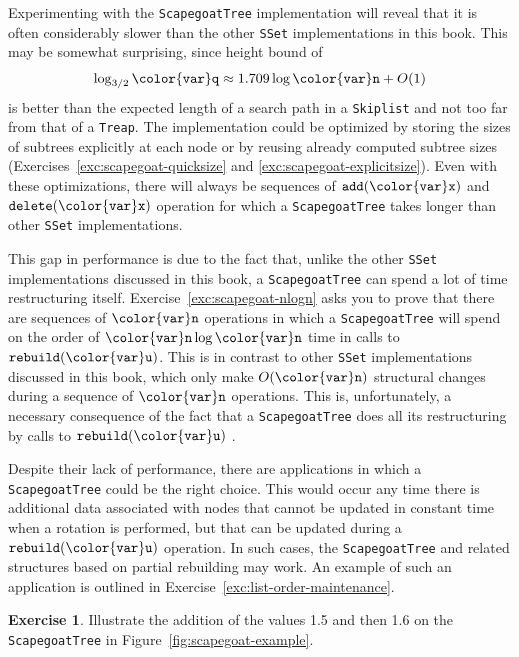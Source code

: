 \documentclass[10pt]{book}
\newcommand{\figref}[1]{Figure~\ref{fig:#1}}
\theoremstyle{plain}
\theoremstyle{definition}
\newtheorem{exc}{Exercise}[chapter]
\newcommand{\excref}[1]{Exercise~\ref{exc:#1}}
\begin{document}
Experimenting with the \texttt{ScapegoatTree} implementation will reveal that
it is often considerably slower than the other \texttt{SSet} implementations
in this book. This may be somewhat surprising, since height bound of
\[
   \log_{3/2}\ensuremath{\mathtt{{\color{var}q}}} \approx 1.709\log \ensuremath{\mathtt{{\color{var}n}}} + O(1)
\] 
is better than the expected length of a search path in a \texttt{Skiplist} and
not too far from that of a \texttt{Treap}.  The implementation could be optimized
by storing the sizes of subtrees explicitly at each node or by reusing
already computed subtree sizes (Exercises~\ref{exc:scapegoat-quicksize}
and \ref{exc:scapegoat-explicitsize}).  Even with these optimizations,
there will always be sequences of \ensuremath{\mathtt{add({\color{var}x})}} and \ensuremath{\mathtt{delete({\color{var}x})}} operation for
which a \texttt{ScapegoatTree} takes longer than other \texttt{SSet} implementations.

This gap in performance is due to the fact that, unlike the other \texttt{SSet}
implementations discussed in this book, a \texttt{ScapegoatTree} can spend a lot
of time restructuring itself.  \excref{scapegoat-nlogn} asks you to prove
that there are sequences of \ensuremath{\mathtt{{\color{var}n}}} operations in which a \texttt{ScapegoatTree}
will spend on the order of $\ensuremath{\mathtt{{\color{var}n}}}\log \ensuremath{\mathtt{{\color{var}n}}}$ time in calls to \ensuremath{\mathtt{rebuild({\color{var}u})}}.
This is in contrast to other \texttt{SSet} implementations discussed in this
book, which only make $O(\ensuremath{\mathtt{{\color{var}n}}})$ structural changes during a sequence
of \ensuremath{\mathtt{{\color{var}n}}} operations.  This is, unfortunately, a necessary consequence of
the fact that a \texttt{ScapegoatTree} does all its restructuring by calls to
\ensuremath{\mathtt{rebuild({\color{var}u})}} \cite{d90}.

Despite their lack of performance, there are applications in which a
\texttt{ScapegoatTree} could be the right choice.  This would occur any time
there is additional data associated with nodes that cannot be updated
in constant time when a rotation is performed, but that can be updated
during a \ensuremath{\mathtt{rebuild({\color{var}u})}} operation.  In such cases, the \texttt{ScapegoatTree}
and related structures based on partial rebuilding may work.  An example of such an application is outlined in \excref{list-order-maintenance}.

\begin{exc}
  Illustrate the addition of the values 1.5 and then 1.6 on the
  \texttt{ScapegoatTree} in \figref{scapegoat-example}.
\end{exc}
\end{document}

